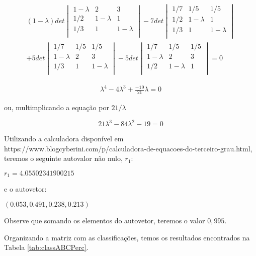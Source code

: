 \documentclass{book}
\begin{document}
\begin{eqnarray}
(1 - \lambda) det{\begin{vmatrix}
1 - \lambda & 2 & 3 \\
1/2 & 1 - \lambda & 1 \\
1/3 & 1 & 1 -\lambda\\
\end{vmatrix}} - 7 det{\begin{vmatrix}
1/7 &  1/5 & 1/5 \\
1/2 & 1 - \lambda & 1 \\
1/3 & 1 & 1 -\lambda\\
\end{vmatrix}} \nonumber \\
+ 5 det{\begin{vmatrix}
1/7 &  1/5 & 1/5 \\
1 - \lambda & 2 & 3 \\
1/3 & 1 & 1 -\lambda\\
\end{vmatrix}} - 5 det{\begin{vmatrix}
1/7 &  1/5 & 1/5 \\
1 - \lambda & 2 & 3 \\
1/2 & 1 - \lambda & 1 \\
\end{vmatrix}}= 0 \nonumber
\end{eqnarray}

\begin{eqnarray}
\lambda^4 - 4\lambda^3 + \frac{-19}{21}\lambda  = 0 \nonumber
\end{eqnarray}

ou, multimplicando a equação por $21/\lambda$

\begin{equation}
21\lambda^3 - 84\lambda^2 - 19 = 0 \nonumber 
\end{equation}

Utilizando a calculadora disponível em https://www.blogcyberini.com/p/calculadora-de-equacoes-do-terceiro-grau.html, teremos o seguinte autovalor não nulo, $r_1$:

$r_1 = 4.05502341900215$

e o autovetor:

$(0.053, 0.491, 0.238, 0.213)$

Observe que somando os elementos do autovetor, teremos o valor $0,995$.

Organizando a matriz com as classificações, temos os resultados encontrados na Tabela \ref{tab:classABCPerc}.
\end{document}
